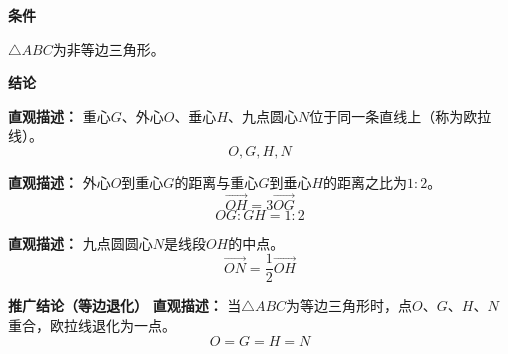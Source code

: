 \begin{statementbox}
	\textbf{\textcolor{CStatement}{条件}}
	\begin{description}[style=nextline, leftmargin=2.8em, labelsep=0.5em, itemsep=0.35em]
		\item[\textbf{\textcolor{CStatement}{条件1（非等边三角形）：}}]
			$\triangle ABC$为非等边三角形。
	\end{description}
	\textbf{\textcolor{CStatement}{结论}}
	\begin{description}[style=nextline, leftmargin=2.8em, labelsep=0.5em, itemsep=0.45em]
		\item[\textbf{\textcolor{CStatement}{结论一（四点共线）：}}]
			\textbf{\textcolor{CStatement}{直观描述：}}
			重心$G$、外心$O$、垂心$H$、九点圆心$N$位于同一条直线上（称为欧拉线）。
			\[
				O,G,H,N
			\]
		\item[\textbf{\textcolor{CStatement}{结论二（比例关系）：}}]
			\textbf{\textcolor{CStatement}{直观描述：}}
			外心$O$到重心$G$的距离与重心$G$到垂心$H$的距离之比为$1:2$。
			\[
				\overrightarrow{OH}=3\overrightarrow{OG}
			\]
			\[
				OG:GH=1:2
			\]
		\item[\textbf{\textcolor{CStatement}{结论三（中点关系）：}}]
			\textbf{\textcolor{CStatement}{直观描述：}}
			九点圆圆心$N$是线段$OH$的中点。
			\[
				\overrightarrow{ON}=\frac12\overrightarrow{OH}
			\]
	\end{description}

	\medskip
	\textbf{\textcolor{CStatement}{推广结论（等边退化）}}
	\textbf{\textcolor{CStatement}{直观描述：}}
	当$\triangle ABC$为等边三角形时，点$O$、$G$、$H$、$N$重合，欧拉线退化为一点。
	\[
		O=G=H=N
	\]
\end{statementbox}
